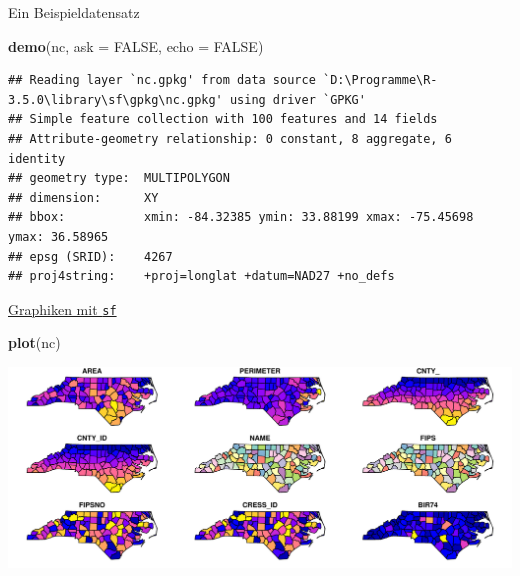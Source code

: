 \documentclass[ignorenonframetext,]{beamer}
\newenvironment{Shaded}{\begin{snugshade}}{\end{snugshade}}
\newcommand{\KeywordTok}[1]{\textcolor[rgb]{0.13,0.29,0.53}{\textbf{#1}}}
\newcommand{\DataTypeTok}[1]{\textcolor[rgb]{0.13,0.29,0.53}{#1}}
\newcommand{\OtherTok}[1]{\textcolor[rgb]{0.56,0.35,0.01}{#1}}
\newcommand{\NormalTok}[1]{#1}
\begin{document}
\begin{frame}[fragile]{Ein Beispieldatensatz}

\begin{Shaded}
\begin{Highlighting}[]
\KeywordTok{demo}\NormalTok{(nc, }\DataTypeTok{ask =} \OtherTok{FALSE}\NormalTok{, }\DataTypeTok{echo =} \OtherTok{FALSE}\NormalTok{)}
\end{Highlighting}
\end{Shaded}

\begin{verbatim}
## Reading layer `nc.gpkg' from data source `D:\Programme\R-3.5.0\library\sf\gpkg\nc.gpkg' using driver `GPKG'
## Simple feature collection with 100 features and 14 fields
## Attribute-geometry relationship: 0 constant, 8 aggregate, 6 identity
## geometry type:  MULTIPOLYGON
## dimension:      XY
## bbox:           xmin: -84.32385 ymin: 33.88199 xmax: -75.45698 ymax: 36.58965
## epsg (SRID):    4267
## proj4string:    +proj=longlat +datum=NAD27 +no_defs
\end{verbatim}

\end{frame}

\begin{frame}[fragile]{\href{https://r-spatial.github.io/sf/articles/sf5.html}{Graphiken
mit \texttt{sf}}}

\begin{Shaded}
\begin{Highlighting}[]
\KeywordTok{plot}\NormalTok{(nc)}
\end{Highlighting}
\end{Shaded}

\includegraphics{slides_all2gether_part2_files/figure-beamer/unnamed-chunk-191-1.pdf}

\end{frame}
\end{document}
